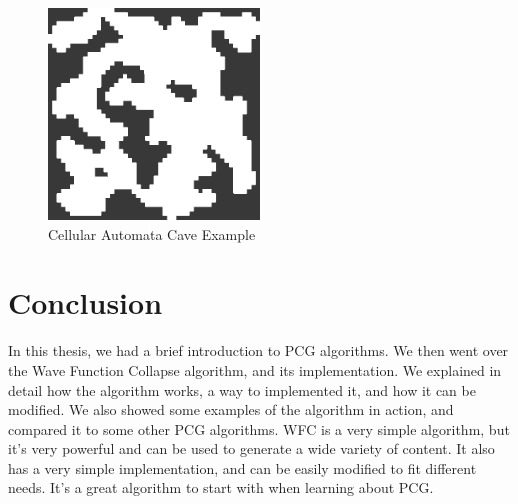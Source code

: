 \documentclass[10pt,oneside,a4paper]{article}
\begin{document}
\begin{figure}[!h]
    \centering
    \includegraphics[width=0.5\textwidth]{figures/cellular-automata-cave.png}
    \caption{Cellular Automata Cave Example}\label{fig:cellular_automata}
\end{figure}

\section{Conclusion}\label{sec:conclusion}
In this thesis, we had a brief introduction to PCG algorithms.
We then went over the Wave Function Collapse algorithm, and its implementation.
We explained in detail how the algorithm works, a way to implemented it, and how it can be modified.
We also showed some examples of the algorithm in action, and compared it to some other PCG algorithms.
WFC is a very simple algorithm, but it's very powerful and can be used to generate a wide variety of content.
It also has a very simple implementation, and can be easily modified to fit different needs.
It's a great algorithm to start with when learning about PCG\@.



\end{document}
